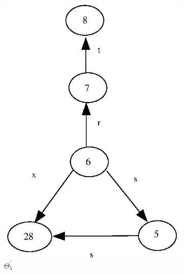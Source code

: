 \documentclass[a4paper,12pt]{article}
\numberwithin{equation}{section}
\numberwithin{figure}{section}
\begin{document}
\begin{figure}
\begin{center}
\begin{subfigure}[b]{.3\columnwidth}
\includegraphics[scale=0.45, bb=0 0  82 280]{ex_K_i4.eps}
\caption{$\Theta_5^\prime$}
\label{fig:K_i4}
\end{subfigure}
\hspace*{2cm}
\begin{subfigure}[b]{.3\columnwidth}

\end{subfigure}
\end{center}
\end{figure}
\end{document}
